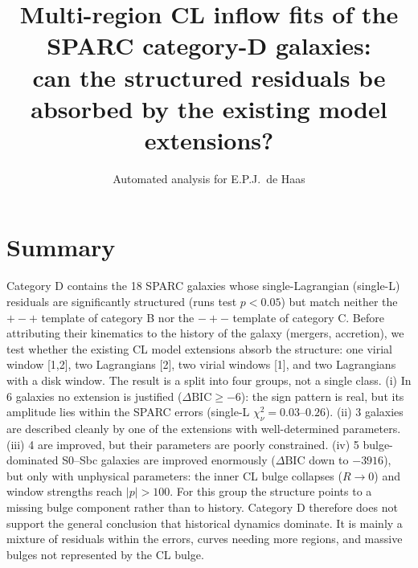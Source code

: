 \documentclass[10pt]{article}
\title{\bfseries Multi-region CL inflow fits of the SPARC category-D galaxies:\\ can the structured residuals be absorbed by the existing model extensions?}
\author{Automated analysis for E.P.J.\ de Haas}\date{}
\begin{document}
\maketitle
\section*{Summary}
Category D contains the 18 SPARC galaxies whose single-Lagrangian (single-L) residuals are significantly structured (runs test $p<0.05$) but match neither the $+-+$ template of category B nor the $-+-$ template of category C. Before attributing their kinematics to the history of the galaxy (mergers, accretion), we test whether the existing CL model extensions absorb the structure: one virial window [1,2], two Lagrangians [2], two virial windows [1], and two Lagrangians with a disk window. The result is a split into four groups, not a single class. (i) In 6 galaxies no extension is justified ($\Delta\mathrm{BIC}\ge-6$): the sign pattern is real, but its amplitude lies within the SPARC errors (single-L $\chi^2_\nu=0.03$--$0.26$). (ii) 3 galaxies are described cleanly by one of the extensions with well-determined parameters. (iii) 4 are improved, but their parameters are poorly constrained. (iv) 5 bulge-dominated S0--Sbc galaxies are improved enormously ($\Delta\mathrm{BIC}$ down to $-3916$), but only with unphysical parameters: the inner CL bulge collapses ($R\to0$) and window strengths reach $|p|>100$. For this group the structure points to a missing bulge component rather than to history. Category D therefore does not support the general conclusion that historical dynamics dominate. It is mainly a mixture of residuals within the errors, curves needing more regions, and massive bulges not represented by the CL bulge.
\end{document}
